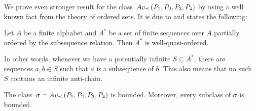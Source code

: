 We prove even stronger result for the class~$Av_{\preceq}\left(P_1,P_2,P_3,P_4\right)$ by using a well known fact from the theory of ordered sets. It is due to \cite{higman} and states the following:

\begin{fct}
\label{fct:Higman}
Let $A$ be a finite alphabet and $A^*$ be a set of finite sequences over $A$ partially ordered by the subsequence relation. Then $A^*$ is well-quasi-ordered.
\end{fct}

In other words, whenever we have a potentially infinite $S\subseteq A^*$, there are sequences $a,b\in S$ such that $a$ is a subsequence of $b$. This also means that no such $S$ contains an infinite anti-chain.

\begin{thm}
The class~$\sigma=Av_{\preceq}\left(P_1,P_2,P_3,P_4\right)$ is bounded. Moreover, every subclass of $\sigma$ is bounded.
\end{thm}
